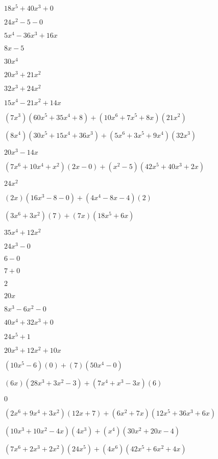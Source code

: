 \documentclass{article}
\begin{document}
\begin{multicols}{2}
$18x^{5}+40x^{3}+0$\item $24x^{2}-5-0$\item $5x^{4}-36x^{3}+16x$\item $8x-5$\item $30x^{4}$\item $20x^{3}+21x^{2}$\item $32x^{3}+24x^{2}$\item $15x^{4}-21x^{2}+14x$\item $(7x^{3})(60x^{5}+35x^{4}+8)+(10x^{6}+7x^{5}+8x)(21x^{2})$\item $(8x^{4})(30x^{5}+15x^{4}+36x^{3})+(5x^{6}+3x^{5}+9x^{4})(32x^{3})$\item $20x^{3}-14x$\item $(7x^{6}+10x^{4}+x^2)(2x-0)+(x^2-5)(42x^{5}+40x^{3}+2x)$\item $24x^{2}$\item $(2x)(16x^{3}-8-0)+(4x^{4}-8x-4)(2)$\item $(3x^{6}+3x^2)(7)+(7x)(18x^{5}+6x)$\item $35x^{4}+12x^{2}$\item $24x^{3}-0$\item $6-0$\item $7+0$\item $2$\item $20x$\item $8x^{3}-6x^{2}-0$\item $40x^{4}+32x^{3}+0$\item $24x^{5}+1$\item $20x^{3}+12x^{2}+10x$\item $(10x^{5}-6)(0)+(7)(50x^{4}-0)$\item $(6x)(28x^{3}+3x^{2}-3)+(7x^{4}+x^{3}-3x)(6)$\item $0$\item $(2x^{6}+9x^{4}+3x^2)(12x+7)+(6x^2+7x)(12x^{5}+36x^{3}+6x)$\item $(10x^{3}+10x^2-4x)(4x^{3})+(x^{4})(30x^{2}+20x-4)$\item $(7x^{6}+2x^{3}+2x^2)(24x^{5})+(4x^{6})(42x^{5}+6x^{2}+4x)$\item 
\end{multicols}
\end{document}
